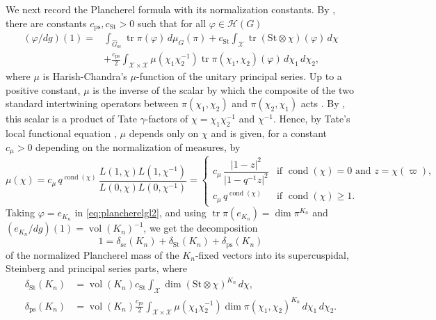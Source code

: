 \documentclass[11pt,reqno]{amsart}
\numberwithin{equation}{section}
\theoremstyle{plain}
\theoremstyle{definition}
\theoremstyle{remark}
\theoremstyle{plain}
\newcommand{\scd}[1]{\delta_{\mathrm{sc}}(#1)}
\newcommand{\Hk}{\mathcal{H}}    %
\newcommand{\Gsc}{\widehat{G}_{\mathrm{sc}}}    %
\newcommand{\Pps}{\delta_{\mathrm{ps}}(K_n)}       %
\newcommand{\Pst}{\delta_{\mathrm{St}}(K_n)}
\newcommand{\Cps}{c_{\mathrm{ps}}}
\newcommand{\Cst}{c_{\mathrm{St}}}
\newcommand{\Cmu}{c_\mu}
\newcommand{\St}{\mathrm{St}}                   %
\newcommand{\Xc}{\mathcal{X}}                   %
\newcommand{\abs}[1]{\lvert#1\rvert}
\DeclareMathOperator{\vol}{vol}
\DeclareMathOperator{\tr}{tr}
\DeclareMathOperator{\cond}{cond}   %
\begin{document}
We next record the Plancherel formula with its normalization constants.
By \cite[Theorem~VIII.1.1]{MR1989693}, there are constants $\Cps,\Cst>0$ such that for all
$\varphi\in\Hk(G)$
\begin{equation}\label{eq:plancherelgl2}
\begin{aligned}
(\varphi/dg)(1)={}&\int_{\Gsc}\tr\pi(\varphi)\,d\mu_G(\pi)
+\Cst\int_{\Xc}\tr(\St\otimes\chi)(\varphi)\,d\chi\\
&+\frac{\Cps}{2}\int_{\Xc\times\Xc}\mu(\chi_1\chi_2^{-1})
\tr\pi(\chi_1,\chi_2)(\varphi)\,d\chi_1\,d\chi_2,
\end{aligned}
\end{equation}
where $\mu$ is Harish-Chandra's $\mu$-function of the unitary principal series.
Up to a positive constant, $\mu$ is the inverse of the scalar by
which the composite of the two standard intertwining operators between
$\pi(\chi_1,\chi_2)$ and $\pi(\chi_2,\chi_1)$ acts
\cite[\S\S IV.3 and V.2]{MR1989693}. By \cite[Proposition~4.5.10]{MR1431508},
this scalar is a product of Tate $\gamma$-factors of $\chi=\chi_1\chi_2^{-1}$ and $\chi^{-1}$. Hence, by
Tate's local functional equation \cite[\S23]{MR2234120}, $\mu$ depends only on $\chi$ and is given,
for a constant $\Cmu>0$ depending on the normalization of measures, by
\begin{equation}\label{eq:mu}
\mu(\chi)=\Cmu\,q^{\cond(\chi)}\,
\frac{L(1,\chi)L(1,\chi^{-1})}{L(0,\chi)L(0,\chi^{-1})}
=\begin{cases}
\Cmu\,\dfrac{\abs{1-z}^2}{\abs{1-q^{-1}z}^2}
&\text{if $\cond(\chi)=0$ and $z=\chi(\varpi)$,}\\[1.5ex]
\Cmu\,q^{\cond(\chi)}&\text{if $\cond(\chi)\ge1$.}
\end{cases}
\end{equation}
Taking $\varphi=e_{K_n}$ in \eqref{eq:plancherelgl2}, and using
$\tr\pi(e_{K_n})=\dim\pi^{K_n}$ and $(e_{K_n}/dg)(1)=\vol(K_n)^{-1}$, we get the decomposition
\begin{equation}\label{eq:threeparts}
1=\scd{K_n}+\Pst+\Pps
\end{equation}
of the normalized Plancherel mass of the $K_n$-fixed vectors into its
supercuspidal, Steinberg and principal series parts, where
\begin{align*}
\Pst&=\vol(K_n)\Cst\int_{\Xc}\dim(\St\otimes\chi)^{K_n}\,d\chi,\\
\Pps&=\vol(K_n)\frac{\Cps}{2}\int_{\Xc\times\Xc}\mu(\chi_1\chi_2^{-1})
\dim\pi(\chi_1,\chi_2)^{K_n}\,d\chi_1\,d\chi_2.
\end{align*}
\end{document}
